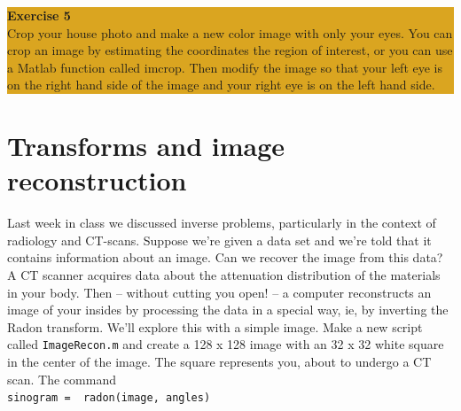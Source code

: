 \documentclass[12pt]{amsart}
\begin{document}
\bigskip
\begin{center}
\colorbox{Goldenrod}{\parbox{15cm}{
{
\textbf{\large Exercise 5}\vspace{1mm} \\
Crop your house photo and make a new color image with only your eyes.  You can crop an image by estimating the coordinates the region of interest, or you can use a Matlab function called imcrop.  Then modify the image so that your left eye is on the right hand side of the image and your right eye is on the left hand side.  }}}
\end{center}

\section{Transforms and image reconstruction}

\noindent Last week in class we discussed inverse problems, particularly in the context of radiology and CT-scans.  Suppose we're given a data set and we're told that it contains information about an image.  Can we recover the image from this data?  A CT scanner acquires data about the attenuation distribution of the materials in your body.  Then -- without cutting you open! -- a computer reconstructs an image of your insides by processing the data in a special way, ie, by inverting the Radon transform.  We'll explore this with a simple image.  Make a new script called \verb+ImageRecon.m+ and create a 128 x 128 image with an 32 x 32 white square in the center of the image.  The square represents you, about to undergo a CT scan.  The command \\

\verb+sinogram =  radon(image, angles)+ \\
\end{document}
